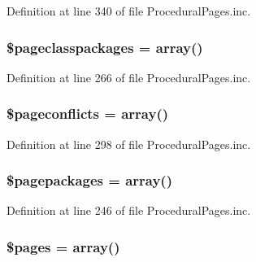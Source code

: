 \-Definition at line 340 of file \-Procedural\-Pages.\-inc.

\hypertarget{class_procedural_pages_a1a9655301a7cc9cce336d051d850de95}{
\subsubsection[{\$pageclasspackages}]{\setlength{\rightskip}{0pt plus 5cm}\$pageclasspackages = array()}}\label{class_procedural_pages_a1a9655301a7cc9cce336d051d850de95}


\-Definition at line 266 of file \-Procedural\-Pages.\-inc.

\hypertarget{class_procedural_pages_ade701f6942125422da1b27586702c655}{
\subsubsection[{\$pageconflicts}]{\setlength{\rightskip}{0pt plus 5cm}\$pageconflicts = array()}}\label{class_procedural_pages_ade701f6942125422da1b27586702c655}


\-Definition at line 298 of file \-Procedural\-Pages.\-inc.

\hypertarget{class_procedural_pages_a00eab2d919d2f34e77bed9fa19a32b2a}{
\subsubsection[{\$pagepackages}]{\setlength{\rightskip}{0pt plus 5cm}\$pagepackages = array()}}\label{class_procedural_pages_a00eab2d919d2f34e77bed9fa19a32b2a}


\-Definition at line 246 of file \-Procedural\-Pages.\-inc.

\hypertarget{class_procedural_pages_a263621399c53f2952c2329ee13ad8e4e}{
\subsubsection[{\$pages}]{\setlength{\rightskip}{0pt plus 5cm}\$pages = array()}}\label{class_procedural_pages_a263621399c53f2952c2329ee13ad8e4e}



